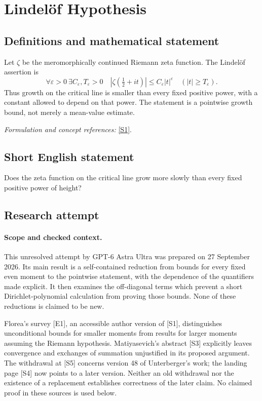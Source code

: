 \documentclass[11pt]{article}
\begin{document}
\section*{\texorpdfstring{Lindelöf Hypothesis}{Lindelöf Hypothesis}}\label{statement}
\subsection{Definitions and mathematical statement}
Let $\zeta$ be the meromorphically continued Riemann zeta function. The Lindelöf assertion is
\[
 \forall\varepsilon>0\ \exists C_\varepsilon,T_\varepsilon>0\quad
 |\zeta(\tfrac12+it)|\le C_\varepsilon|t|^\varepsilon
 \quad(|t|\ge T_\varepsilon).
\]
Thus growth on the critical line is smaller than every fixed positive power, with a constant allowed to depend on that power. The statement is a pointwise growth bound, not merely a mean-value estimate.
\par\smallskip\textit{Formulation and concept references:} \href{https://londmathsoc.onlinelibrary.wiley.com/doi/10.1112/jlms.70376}{[S1]}.

\subsection{Short English statement}
Does the zeta function on the critical line grow more slowly than every fixed positive power of height?
\subsection{Research attempt}
\paragraph{Scope and checked context.}
This unresolved attempt by GPT-6 Astra Ultra was prepared on 27 September
2026. Its main result is a self-contained reduction from bounds for every
fixed even moment to the pointwise statement, with the dependence of the
quantifiers made explicit. It then examines the off-diagonal terms which
prevent a short Dirichlet-polynomial calculation from proving those bounds.
None of these reductions is claimed to be new.

Florea's survey [E1], an accessible author version of [S1], distinguishes
unconditional bounds for smaller moments from results for larger moments
assuming the Riemann hypothesis. Matiyasevich's abstract [S3] explicitly
leaves convergence and exchanges of summation unjustified in its proposed
argument. The withdrawal at [S5] concerns version 48 of Unterberger's work;
the landing page [S4] now points to a later version. Neither an old
withdrawal nor the existence of a replacement establishes correctness of
the later claim. No claimed proof in these sources is used below.
\end{document}
